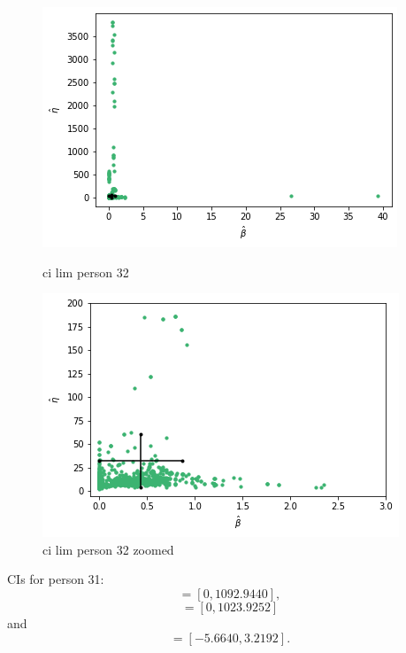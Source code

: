 \begin{figure}
    \centering
    \begin{minipage}{0.48\textwidth}
        \centering
        \includegraphics[scale=0.37]{pictures/ci_lim_b_e_person32.png}
        \caption{ci lim person 32}
        \label{fig:ci_lim_b_e_person_32}
    \end{minipage}\hfill
    \begin{minipage}{0.48\textwidth}
        \centering
        \includegraphics[scale=0.37]{pictures/ci_lim_b_e_person32_zoomed.png}
        \caption{ci lim person 32 zoomed}
        \label{fig:ci_lim_b_e_person_32_zoomed}
    \end{minipage}
\end{figure}



CIs for person 31:
\begin{equation*}
    [\hat{\alpha}^{*(5)}_{1000},\hat{\alpha}^{*(95)}_{1000}] = [0,1092.9440],
\end{equation*}
\begin{equation*}
    [\hb^{*(5)}_{1000},\hb^{*(95)}_{1000}] = [0,1023.9252]
\end{equation*}
and
\begin{equation*}
    [\hat{\eta}^{*(5)}_{1000},\hat{\eta}^{*(95)}_{1000}] = [-5.6640,3.2192].
\end{equation*}

